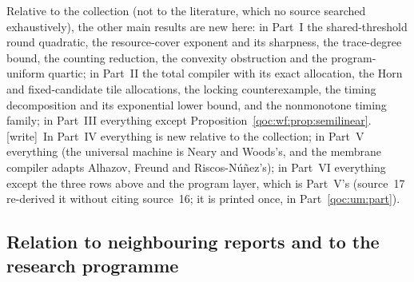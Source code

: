 \documentclass[11pt,letterpaper]{article}
\theoremstyle{definition}
\theoremstyle{remark}
\newcommand{\wtag}{\textup{[write]}}
\begin{document}
Relative to the collection (not to the literature, which no source searched exhaustively), the other main results are new here: in Part~I the shared-threshold round quadratic, the resource-cover exponent and its sharpness, the trace-degree bound, the counting reduction, the convexity obstruction and the program-uniform quartic; in Part~II the total compiler with its exact allocation, the Horn and fixed-candidate tile allocations, the locking counterexample, the timing decomposition and its exponential lower bound, and the nonmonotone timing family; in Part~III everything except Proposition~\ref{qoc:wf:prop:semilinear}. \wtag\ In Part~IV everything is new relative to the collection; in Part~V everything (the universal machine is Neary and Woods's, and the membrane compiler adapts Alhazov, Freund and Riscos-N\'u\~nez's); in Part~VI everything except the three rows above and the program layer, which is Part~V's (source~17 re-derived it without citing source~16; it is printed once, in Part~\ref{qoc:um:part}).

\subsection{Relation to neighbouring reports and to the research programme}\label{qoc:sec:relation}
\end{document}
